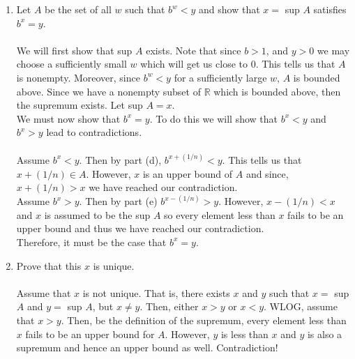 \documentclass[12pt]{article}
\begin{document}
\begin{enumerate}
\item Let $A$ be the set of all $w$ such that $b^{w}<y$ and show that $x=$ sup $A$ satisfies $b^{x}=y$. \\ \\
We will first show that sup $A$ exists. Note that since $b>1$, and $y>0$ we may choose a sufficiently small $w$ which will get us close to $0$. This tells us that $A$ is nonempty. Moreover, since $b^{w}<y$ for a sufficiently large $w$, $A$ is bounded above. Since we have a nonempty subset of $\mathbb{R}$ which is bounded above, then the supremum exists. Let sup $A = x$. \\ 
We must now show that $b^{x}=y$. To do this we will show that $b^{x}<y$ and $b^{x}>y$ lead to contradictions. \\ \\
Assume $b^{x}<y$. Then by part (d), $b^{x+(1/n)} < y$. This tells us that $x+(1/n) \in A$. However, $x$ is an upper bound of $A$ and since, $x+(1/n) > x$ we have reached our contradiction. \\
Assume $b^{x}>y$. Then by part (e) $b^{x-(1/n)}>y$. However, $x-(1/n) < x$ and $x$ is assumed to be the sup $A$ so every element less than $x$ fails to be an upper bound and thus we have reached our contradiction. \\
Therefore, it must be the case that $b^{x}=y$.

\item Prove that this $x$ is unique. \\ \\
Assume that $x$ is not unique. That is, there exists $x$ and $y$ such that $x=$ sup $A$ and $y=$ sup $A$, but $x \neq y$. Then, either $x>y$ or $x<y$. WLOG, assume that $x>y$. Then, be the definition of the supremum, every element less than $x$ fails to be an upper bound for $A$. However, $y$ is less than $x$ and $y$ is also a supremum and hence an upper bound as well. Contradiction!
\end{enumerate}
\end{document}
